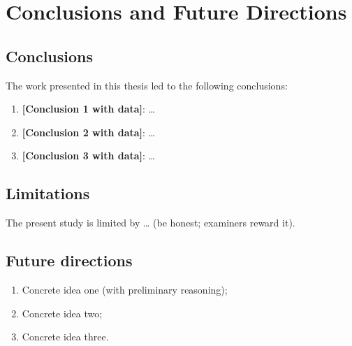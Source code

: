 \chapter{Conclusions and Future Directions}
\label{ch:conclusions}

\section{Conclusions}
\label{sec:concl}
The work presented in this thesis led to the following conclusions:
\begin{enumerate}
  \item \textbf{[Conclusion 1 with data]}: \ldots{}
  \item \textbf{[Conclusion 2 with data]}: \ldots{}
  \item \textbf{[Conclusion 3 with data]}: \ldots{}
\end{enumerate}

\section{Limitations}
\label{sec:limits}
The present study is limited by \ldots{} (be honest; examiners reward it).

\section{Future directions}
\label{sec:future}
\begin{enumerate}
  \item Concrete idea one (with preliminary reasoning);
  \item Concrete idea two;
  \item Concrete idea three.
\end{enumerate}
